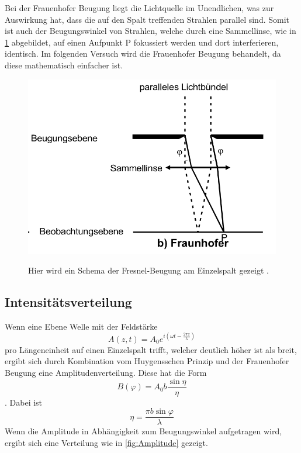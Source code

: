 Bei der Frauenhofer Beugung liegt die Lichtquelle im Unendlichen, was zur Auswirkung hat, dass die auf den Spalt treffenden Strahlen parallel sind.
Somit ist auch der Beugungswinkel von Strahlen, welche durch eine Sammellinse, wie in \ref{fig:Frauenhofer} abgebildet, auf einen Aufpunkt P fokussiert werden und dort interferieren, identisch.
Im folgenden Versuch wird die Frauenhofer Beugung behandelt, da diese mathematisch einfacher ist.

\begin{figure}[H]
    \centering
    \caption{Hier wird ein Schema der Fresnel-Beugung am Einzelspalt gezeigt \cite{V406}.}
    \includegraphics{Bilder/Frauenhofer.png}
    \label{fig:Frauenhofer}
\end{figure}

\subsection{Intensitätsverteilung}
Wenn eine Ebene Welle mit der Feldstärke
\begin{equation}
    A(z,t)=A_0 e^{i(\omega t - \frac{2 \pi z}{\lambda} )}
    \label{eqn:Feldstärke}
\end{equation}
pro Längeneinheit auf einen Einzelspalt trifft, welcher deutlich höher ist als breit, ergibt sich durch Kombination vom Huygensschen Prinzip und der Frauenhofer Beugung eine Amplitudenverteilung.
Diese hat die Form 
\begin{equation}
    B(\varphi)=A_0 b \frac{\sin \eta}{\eta}
    \label{eqn:Amplitude}
\end{equation}
 .
 Dabei ist 
 \begin{equation}
    \eta = \frac{\pi b \sin{\varphi}}{\lambda}
 \end{equation}
Wenn die Amplitude in Abhängigkeit zum Beugungswinkel aufgetragen wird, ergibt sich eine Verteilung wie in \ref{fig:Amplitude} gezeigt.


